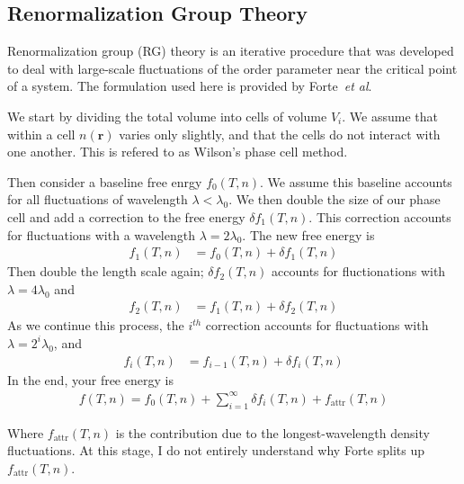 \documentclass[letterpaper,twocolumn,amsmath,amssymb,prb]{revtex4-1}
\newcommand{\rr}{\ensuremath{\mathbf{r}}}
\newcommand{\fattr}{\ensuremath{f_\text{attr}(T,n)}}
\newcommand{\1}{\ensuremath{\textbf{r}_1}}
\newcommand{\2}{\ensuremath{\textbf{r}_2}}
\newcommand{\3}{\ensuremath{\textbf{r}_3}}
\newcommand{\4}{\ensuremath{\textbf{r}_4}}
\begin{document}
\subsection{Renormalization Group Theory}\label{subsec:RGT}
Renormalization group (RG) theory is an iterative procedure that was
developed to deal with large-scale fluctuations of the order parameter
near the critical point of a system. The formulation used here is
provided by Forte~\textit{et al}.\cite{Forte11}

We start by dividing the total volume into cells of volume $V_i$. We
assume that within a cell $n(\rr)$ varies only slightly, and that the
cells do not interact with one another. This is refered to as Wilson's
phase cell method.\cite{Ramana12}

Then consider a baseline free enrgy $f_0(T,n)$. We assume this
baseline accounts for all fluctuations of wavelength $\lambda <
\lambda_0$. We then double the size of our phase cell and add a
correction to the free energy $\delta f_1(T,n)$. This correction
accounts for fluctuations with a wavelength $\lambda =
2\lambda_0$. The new free energy is
\begin{align}
  f_1(T,n) &= f_0(T,n) + \delta f_1(T,n)
\end{align}
Then double the length scale again; $\delta f_2(T,n)$ accounts for
fluctionations with $\lambda = 4\lambda_0$ and
\begin{align}
  f_2(T,n) &= f_1(T,n) + \delta f_2(T,n)
\end{align}
As we continue this process, the $i^{th}$ correction accounts for
fluctuations with $\lambda = 2^i\lambda_0$, and
\begin{align}
  f_i(T,n) &= f_{i-1}(T,n) + \delta f_i(T,n)
\end{align}
In the end, your free energy is
\begin{align}
  f(T,n) = f_0(T,n) + \sum_{i=1}^\infty\delta f_i(T,n) + \fattr
\end{align}

Where $\fattr$ is the contribution due to the longest-wavelength
density fluctuations. At this stage, I do not entirely understand why
Forte splits up $\fattr$.
\end{document}
